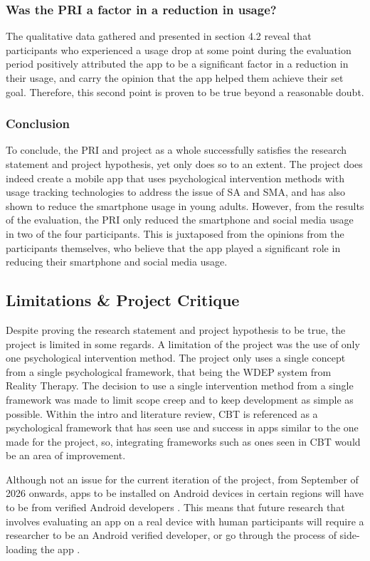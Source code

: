 \documentclass[12pt]{article}
\begin{document}
\subsubsection{Was the PRI a factor in a reduction in usage?}
The qualitative data gathered and presented in section 4.2 reveal that participants who experienced a usage drop at some point during the evaluation period positively 
attributed the app to be a significant factor in a reduction in their usage, and carry the opinion that the app helped them achieve their set goal. Therefore, this second point is proven to be true 
beyond a reasonable doubt.

\subsubsection{Conclusion}
To conclude, the PRI and project as a whole successfully satisfies the research statement and project hypothesis, yet only does so to an extent. The project does indeed create a mobile app that 
uses psychological intervention methods with usage tracking technologies to address the issue of SA and SMA, and has also shown to reduce the smartphone usage in young adults. However, from the 
results of the evaluation, the PRI only reduced the smartphone and social media usage in two of the four participants. This is juxtaposed from the opinions from the participants themselves, who 
believe that the app played a significant role in reducing their smartphone and social media usage.

\subsection{Limitations \& Project Critique}
Despite proving the research statement and project hypothesis to be true, the project is limited in some regards. A limitation of the project was the use of only one 
psychological intervention method. The project only uses a single concept from a single psychological framework, that being the WDEP system from Reality Therapy. The 
decision to use a single intervention method from a single framework was made to limit scope creep and to keep development as simple as possible. Within the intro and
literature review, CBT is referenced as a psychological framework that has seen use and success in apps similar to the one made for the project, so, integrating
frameworks such as ones seen in CBT would be an area of improvement. \newline

Although not an issue for the current iteration of the project, from September of 2026 onwards, apps to be installed on Android devices in certain regions will have to 
be from verified Android developers \autocite{androiddevelopment-verification}. This means that future research that involves evaluating an app on a real device with human 
participants will require a researcher to be an Android verified developer, or go through the process of side-loading the app \autocite{androiddevelopment-blog}. \newline
\end{document}
